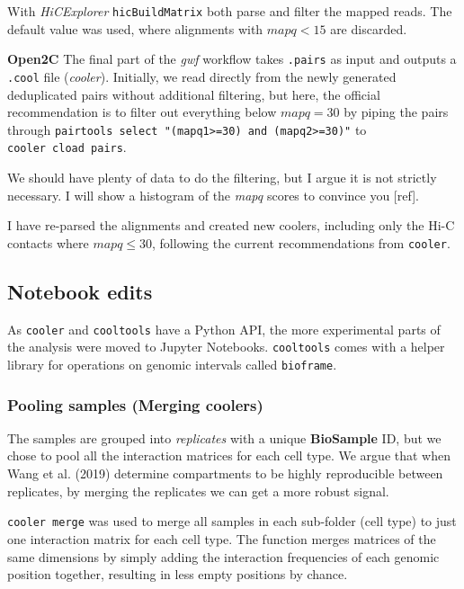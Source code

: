 \documentclass[
  11pt,
  a4paper,
]{scrbook}
\let\oldemph\emph
\renewcommand\emph[1]{\oldemph{\color{gray}#1}}
\begin{document}
With \emph{HiCExplorer} \texttt{hicBuildMatrix} both parse and filter
the mapped reads. The default value was used, where alignments with
\(mapq < 15\) are discarded.

\textbf{Open2C} The final part of the \emph{gwf} workflow takes
\texttt{.pairs} as input and outputs a \texttt{.cool} file
(\emph{cooler}). Initially, we read directly from the newly generated
deduplicated pairs without additional filtering, but here, the official
recommendation is to filter out everything below \(mapq = 30\) by piping
the pairs through
\texttt{pairtools\ select\ "(mapq1\textgreater{}=30)\ and\ (mapq2\textgreater{}=30)"}
to \texttt{cooler\ cload\ pairs}.

We should have plenty of data to do the filtering, but I argue it is not
strictly necessary. I will show a histogram of the \emph{mapq} scores to
convince you {[}ref{]}.

I have re-parsed the alignments and created new coolers, including only
the Hi-C contacts where \(mapq \leq 30\), following the current
recommendations from \texttt{cooler}.

\subsection{Notebook edits}\label{notebook-edits}

As \texttt{cooler} and \texttt{cooltools} have a Python API, the more
experimental parts of the analysis were moved to Jupyter Notebooks.
\texttt{cooltools} comes with a helper library for operations on genomic
intervals called \texttt{bioframe}.

\subsubsection{Pooling samples (Merging
coolers)}\label{pooling-samples-merging-coolers}

The samples are grouped into \emph{replicates} with a unique
\textbf{BioSample} ID, but we chose to pool all the interaction matrices
for each cell type. We argue that when Wang et al. (2019) determine
compartments to be highly reproducible between replicates, by merging
the replicates we can get a more robust signal.

\texttt{cooler\ merge} was used to merge all samples in each sub-folder
(cell type) to just one interaction matrix for each cell type. The
function merges matrices of the same dimensions by simply adding the
interaction frequencies of each genomic position together, resulting in
less empty positions by chance.
\end{document}
